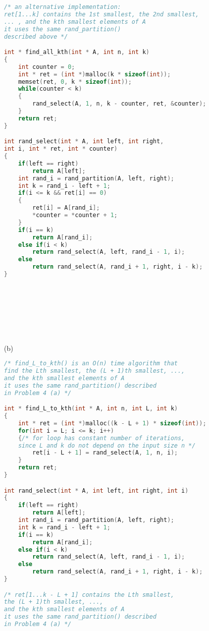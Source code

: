 \documentclass[12pt,border=4pt,multi]{article}%
\begin{document}
\begin{lstlisting}[language = c, mathescape = true]
/* an alternative implementation:
ret[1...k] contains the 1st smallest, the 2nd smallest,
... , and the kth smallest elements of A
it uses the same rand_partition() 
described above */

int * find_all_kth(int * A, int n, int k)
{
    int counter = 0;
    int * ret = (int *)malloc(k * sizeof(int));
    memset(ret, 0, k * sizeof(int));
    while(counter < k)
    {
        rand_select(A, 1, n, k - counter, ret, &counter);
    }
    return ret;
}

int rand_select(int * A, int left, int right,
int i, int * ret, int * counter)
{
    if(left == right)
        return A[left];
    int rand_i = rand_partition(A, left, right);
    int k = rand_i - left + 1;
    if(i <= k && ret[i] == 0)
    {
        ret[i] = A[rand_i];
        *counter = *counter + 1;
    }
    if(i == k)
        return A[rand_i];
    else if(i < k)
        return rand_select(A, left, rand_i - 1, i);
    else
        return rand_select(A, rand_i + 1, right, i - k);
}
\end{lstlisting}
\\
\\
\\
\\
\\
\\
\newpage
\noindent
(b)
\begin{lstlisting}[language = c, mathescape = true]
/* find_L_to_kth() is an O(n) time algorithm that
find the Lth smallest, the (L + 1)th smallest, ...,
and the kth smallest elements of A 
it uses the same rand_partition() described 
in Problem 4 (a) */

int * find_L_to_kth(int * A, int n, int L, int k)
{
    int * ret = (int *)malloc((k - L + 1) * sizeof(int));
    for(int i = L; i <= k; i++)
    {/* for loop has constant number of iterations, 
    since L and k do not depend on the input size n */
        ret[i - L + 1] = rand_select(A, 1, n, i);
    }
    return ret;
}

int rand_select(int * A, int left, int right, int i)
{
    if(left == right)
        return A[left];
    int rand_i = rand_partition(A, left, right);
    int k = rand_i - left + 1;
    if(i == k)
        return A[rand_i];
    else if(i < k)
        return rand_select(A, left, rand_i - 1, i);
    else
        return rand_select(A, rand_i + 1, right, i - k);
}

/* ret[1...k - L + 1] contains the Lth smallest,
the (L + 1)th smallest, ..., 
and the kth smallest elements of A 
it uses the same rand_partition() described 
in Problem 4 (a) */
\end{lstlisting}
\end{document}

